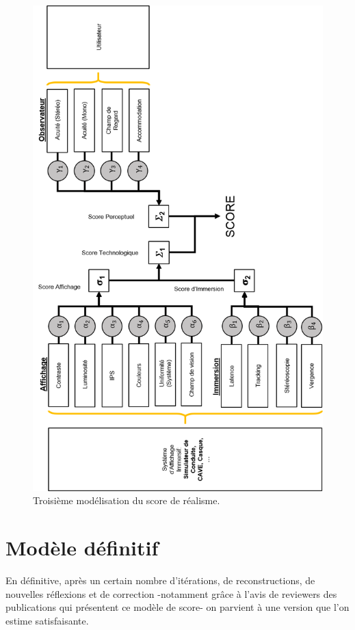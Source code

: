 	\begin{figure}
		\centering
		\includegraphics[scale=1]{Figures/Modele3}
		\caption{Troisième modélisation du score de réalisme.}
		\label{fig:modèle_3}
	\end{figure}
	
	\section{Modèle définitif}		
	\par En définitive, après un certain nombre d'itérations, de reconstructions, de nouvelles réflexions et de correction -notamment grâce à l'avis de reviewers des publications qui présentent ce modèle de score- on parvient à une version que l'on estime satisfaisante.
	
